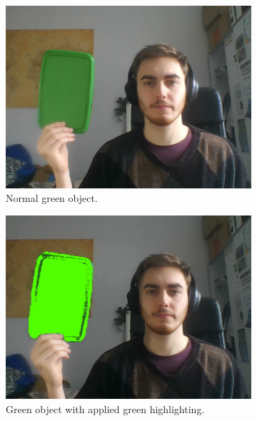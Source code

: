 \documentclass{l4proj}
\begin{document}
\begin{appendices}
\begin{figure}[!ht]
\begin{subfigure}{0.42\textwidth}
        \centering
        \includegraphics[width=\textwidth]{images/colour-conversion-green-before.pdf}
        \caption{Normal green object.}
        \label{fig:colour-conversion-green-before} 
    \end{subfigure}
    \begin{subfigure}{0.42\textwidth}
        \centering
        \includegraphics[width=\textwidth]{images/colour-conversion-green-after.pdf}
        \caption{Green object with applied green highlighting.}
        \label{colour-conversion-green-after} 
    \end{subfigure}
    \begin{subfigure}{0.42\textwidth}
        \centering

\end{subfigure}
\end{figure}
\end{appendices}
\end{document}
